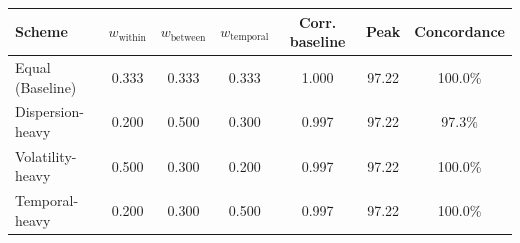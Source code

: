 \begin{tabular}{lcccccc}
\toprule
Scheme & $w_{\text{within}}$ & $w_{\text{between}}$ & $w_{\text{temporal}}$ & Corr. baseline & Peak & Concordance \\
\midrule
Equal (Baseline) & 0.333 & 0.333 & 0.333 & 1.000 & 97.22 & 100.0\% \\
Dispersion-heavy & 0.200 & 0.500 & 0.300 & 0.997 & 97.22 & 97.3\% \\
Volatility-heavy & 0.500 & 0.300 & 0.200 & 0.997 & 97.22 & 100.0\% \\
Temporal-heavy & 0.200 & 0.300 & 0.500 & 0.997 & 97.22 & 100.0\% \\
\bottomrule
\end{tabular}
